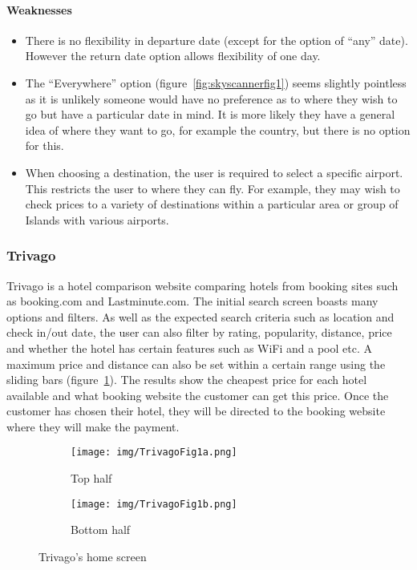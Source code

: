 \paragraph{Weaknesses}
\begin{itemize}
	\item There is no flexibility in departure date (except for the option of
		``any'' date). However the return date option allows flexibility of one
		day.
	\item The ``Everywhere'' option (figure~\ref{fig:skyscannerfig1}) seems
		slightly pointless as it is unlikely someone would have no preference
		as to where they wish to go but have a particular date in mind. It is
		more likely they have a general idea of where they want to go, for
		example the country, but there is no option for this.
	\item When choosing a destination, the user is required to select a
		specific airport. This restricts the user to where they can fly. For
		example, they may wish to check prices to a variety of destinations
		within a particular area or group of Islands with various airports.
\end{itemize}

\newpage

\subsubsection{Trivago}
\label{ssub:trivago}

Trivago is a hotel comparison website comparing hotels from booking sites such
as booking.com and Lastminute.com. The initial search screen boasts many
options and filters. As well as the expected search criteria such as location
and check in/out date, the user can also filter by rating, popularity,
distance, price and whether the hotel has certain features such as WiFi and a
pool etc. A maximum price and distance can also be set within a certain range
using the sliding bars (figure~\ref{fig:trivago1}). The results show the
cheapest price for each hotel available and what booking website the customer
can get this price. Once the customer has chosen their hotel, they will be
directed to the booking website where they will make the payment.
\begin{figure}[ht]
	\centering
	\begin{subfigure}[b]{0.2\textwidth}
		\texttt{[image: img/TrivagoFig1a.png]}
		\caption{Top half}
	\end{subfigure}
	\qquad
	\begin{subfigure}[b]{0.2\textwidth}
		\texttt{[image: img/TrivagoFig1b.png]}
		\caption{Bottom half}
	\end{subfigure}
	\caption{Trivago's home screen}\label{fig:trivago1}
\end{figure}

